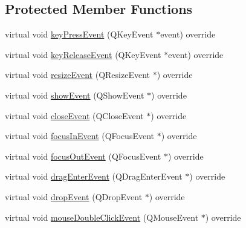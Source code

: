 \subsection*{Protected Member Functions}
\begin{DoxyCompactItemize}
\item 
virtual void \mbox{\hyperlink{class_q_g_b_a_1_1_window_a2594ee922d42d87af1e9bba7d2b27c34}{key\+Press\+Event}} (Q\+Key\+Event $\ast$event) override
\item 
virtual void \mbox{\hyperlink{class_q_g_b_a_1_1_window_af4cac6fae4caf6d917b26a03f3a9fa5d}{key\+Release\+Event}} (Q\+Key\+Event $\ast$event) override
\item 
virtual void \mbox{\hyperlink{class_q_g_b_a_1_1_window_adac05c3906a40aa9166786fca33e7ecc}{resize\+Event}} (Q\+Resize\+Event $\ast$) override
\item 
virtual void \mbox{\hyperlink{class_q_g_b_a_1_1_window_a3b5f624c58beca8a034de91f9ce8df13}{show\+Event}} (Q\+Show\+Event $\ast$) override
\item 
virtual void \mbox{\hyperlink{class_q_g_b_a_1_1_window_a8ee7661af04e726c88f9628fe5de8236}{close\+Event}} (Q\+Close\+Event $\ast$) override
\item 
virtual void \mbox{\hyperlink{class_q_g_b_a_1_1_window_a1757fad68d968a3e29494778672e3815}{focus\+In\+Event}} (Q\+Focus\+Event $\ast$) override
\item 
virtual void \mbox{\hyperlink{class_q_g_b_a_1_1_window_a5d8cd182b94491e972b174228aab3d6a}{focus\+Out\+Event}} (Q\+Focus\+Event $\ast$) override
\item 
virtual void \mbox{\hyperlink{class_q_g_b_a_1_1_window_a4560a50bc987c8444b86f711d4649e01}{drag\+Enter\+Event}} (Q\+Drag\+Enter\+Event $\ast$) override
\item 
virtual void \mbox{\hyperlink{class_q_g_b_a_1_1_window_a48f865692e88e6cc9cf738f69597866f}{drop\+Event}} (Q\+Drop\+Event $\ast$) override
\item 
virtual void \mbox{\hyperlink{class_q_g_b_a_1_1_window_a98f5456e4ef7083a5719f929b1520b4e}{mouse\+Double\+Click\+Event}} (Q\+Mouse\+Event $\ast$) override
\end{DoxyCompactItemize}
